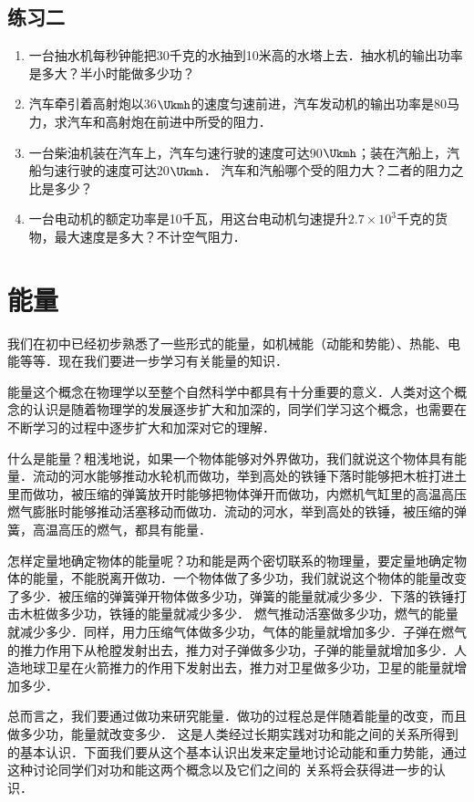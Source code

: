 \subsection*{练习二}
\begin{enumerate}
    \item 一台抽水机每秒钟能把30千克的水抽到10米高的水塔上去．抽水机的输出功率是多大？半小时能做多少功？
    \item 汽车牵引着高射炮以36$\Ukmh$的速度匀速前进，汽车发动机的输出功率是80马力，求汽车和高射炮在前进中所受的阻力．
    \item 一台柴油机装在汽车上，汽车匀速行驶的速度可达90$\Ukmh$；装在汽船上，汽船匀速行驶的速度可达20$\Ukmh$．
    汽车和汽船哪个受的阻力大？二者的阻力之比是多少？
    \item 一台电动机的额定功率是10千瓦，用这台电动机匀速提升$2.7\times 10^3$千克的货物，最大速度是多大？不计空气阻力．
\end{enumerate}

\section{能量}\label{sec-A-07-energy}
我们在初中已经初步熟悉了一些形式的能量，如机械能（动能和势能）、热能、电能等等．现在我们要进一步学习有关能量的知识．

能量这个概念在物理学以至整个自然科学中都具有十分重要的意义．人类对这个概念的认识是随着物理学的发展逐步扩大和加深的，同学们学习这个概念，也需要在不断学习的过程中逐步扩大和加深对它的理解．

什么是能量？粗浅地说，如果一个物体能够对外界做功，我们就说这个物体具有能量．流动的河水能够推动水轮机而做功，举到高处的铁锤下落时能够把木桩打进土里而做功，被压缩的弹簧放开时能够把物体弹开而做功，内燃机气缸里的高温高压燃气膨胀时能够推动活塞移动而做功．流动的河水，举到高处的铁锤，被压缩的弹簧，高温高压的燃气，都具有能量．

怎样定量地确定物体的能量呢？功和能是两个密切联系的物理量，要定量地确定物体的能量，不能脱离开做功．一个物体做了多少功，我们就说这个物体的能量改变了多少．被压缩的弹簧弹开物体做多少功，弹簧的能量就减少多少．下落的铁锤打击木桩做多少功，铁锤的能量就减少多少．
燃气推动活塞做多少功，燃气的能量就减少多少．同样，用力压缩气体做多少功，气体的能量就增加多少．子弹在燃气的推力作用下从枪膛发射出去，推力对子弹做多少功，子弹的能量就增加多少．人造地球卫星在火箭推力的作用下发射出去，推力对卫星做多少功，卫星的能量就增加多少．

总而言之，我们要通过做功来研究能量．做功的过程总是伴随着能量的改变，而且做多少功，能量就改变多少．
这是人类经过长期实践对功和能之间的关系所得到的基本认识．下面我们要从这个基本认识出发来定量地讨论动能和重力势能，通过这种讨论同学们对功和能这两个概念以及它们之间的
关系将会获得进一步的认识．

